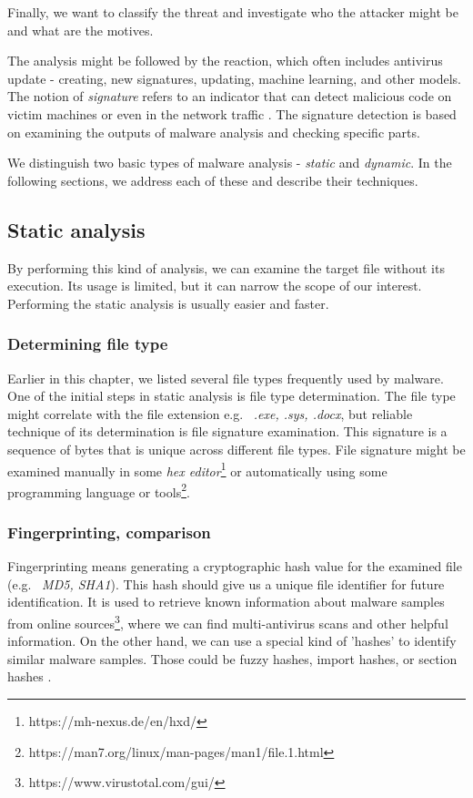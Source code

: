 Finally, we want to classify the threat and investigate who the attacker might be and what are the motives.

The analysis might be followed by the reaction, which often includes antivirus update - creating, new signatures, updating, machine learning, and other models. The notion of \emph{signature} refers to an indicator that can detect malicious code on victim machines or even in the network traffic \cite{Sikorski2012}. The signature detection is based on examining the outputs of malware analysis and checking specific parts.

We distinguish two basic types of malware analysis - \emph{static} and \emph{dynamic}. In the following sections, we address each of these and describe their techniques.

\subsection{Static analysis}
By performing this kind of analysis, we can examine the target file without its execution. Its usage is limited, but it can narrow the scope of our interest. \cite{KA2018} Performing the static analysis is usually easier and faster. \cite{Sikorski2012}

\subsubsection*{Determining file type}
Earlier in this chapter, we listed several file types frequently used by malware. One of the initial steps in static analysis is file type determination. The file type might correlate with the file extension e.g. \ \emph{.exe, .sys, .docx}, but reliable technique of its determination is file signature examination. This signature is a sequence of bytes that is unique across different file types. File signature might be examined manually in some \emph{hex editor}\footnote{https://mh-nexus.de/en/hxd/} or automatically using some programming language or tools\footnote{https://man7.org/linux/man-pages/man1/file.1.html}. \cite{KA2018} 


\subsubsection*{Fingerprinting, comparison}
Fingerprinting means generating a cryptographic hash value for the examined file (e.g. \ \emph{MD5, SHA1}). This hash should give us a unique file identifier for future identification. It is used to retrieve known information about malware samples from online sources\footnote{https://www.virustotal.com/gui/}, where we can find multi-antivirus scans and other helpful information. On the other hand, we can use a special kind of 'hashes' to identify similar malware samples. Those could be fuzzy hashes, import hashes, or section hashes \cite{KA2018}.

